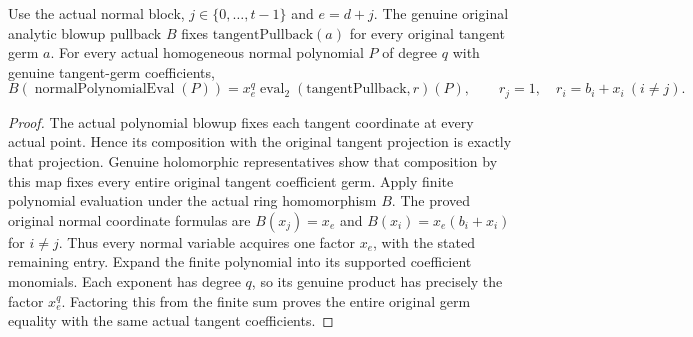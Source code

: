 \begin{theorem}
\label{hir:actual-normal-polynomial-blowup-factorization}
Use the actual normal block, $j\in\{0,\ldots,t-1\}$ and $e=d+j$.
The genuine original analytic blowup pullback $B$ fixes
$\mathrm{tangentPullback}(a)$ for every original tangent germ $a$.
For every actual homogeneous normal polynomial $P$ of degree $q$
with genuine tangent-germ coefficients,
\[
 B(\operatorname{normalPolynomialEval}(P))
 =x_e^q\operatorname{eval}_2(\mathrm{tangentPullback},r)(P),
 \qquad r_j=1,\quad r_i=b_i+x_i\ (i\ne j).
\]
\leanok
\end{theorem}
\begin{proof}
The actual polynomial blowup fixes each tangent coordinate at every
actual point. Hence its composition with the original tangent
projection is exactly that projection. Genuine holomorphic
representatives show that composition by this map fixes every entire
original tangent coefficient germ. Apply finite polynomial evaluation
under the actual ring homomorphism $B$. The proved original normal
coordinate formulas are $B(x_j)=x_e$ and
$B(x_i)=x_e(b_i+x_i)$ for $i\ne j$. Thus every normal variable
acquires one factor $x_e$, with the stated remaining entry. Expand the
finite polynomial into its supported coefficient monomials. Each
exponent has degree $q$, so its genuine product has precisely the
factor $x_e^q$. Factoring this from the finite sum proves the entire
original germ equality with the same actual tangent coefficients.
\end{proof}

